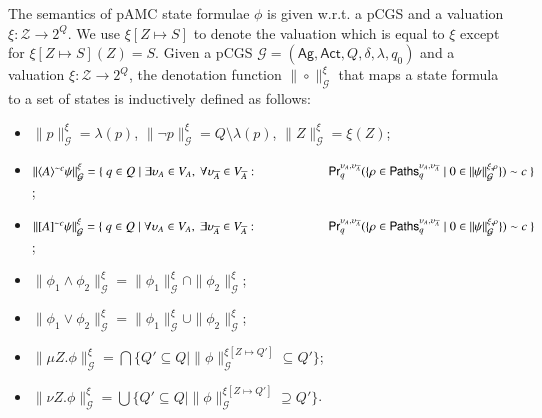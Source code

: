 \documentclass[letterpaper]{article}
\newcommand{\calZ}{\mathcal{Z}}
\newcommand{\calM}{\mathcal{G}}
\newcommand{\calP}{{\sf Paths}}
\newcommand{\Ag}{\textsf{Ag}}
\newcommand{\Act}{\textsf{Act}}
\newcommand{\Prb}{\textsf{Pr}}
\newcommand{\nA}{\overline{A}}
\newcommand{\pamc}{{pAMC}\xspace}
\newcommand{\opA}[1]{\langle{#1}\rangle}
\newcommand{\opUA}[1]{[{#1}]}
\newcommand {\semantics}[1]{\|{#1}\|}  %
\begin{document}
The semantics of \pamc state formulae $\phi$ is given w.r.t. a pCGS and a valuation $\xi:\calZ\rightarrow 2^Q$.
We use $\xi[Z\mapsto S]$ to denote the valuation which is equal to $\xi$ except for $\xi[Z\mapsto S](Z)=S$.
Given a pCGS $\calM=(\Ag,\Act, Q, \delta,\lambda,q_0)$ and a valuation $\xi:\calZ\rightarrow 2^Q$,
the denotation function $\semantics{\circ}_\calM^\xi$ that maps a state formula to a set of states is inductively defined as follows:

\begin{itemize}
  \item $\semantics{p}_\calM^\xi=\lambda(p)$, $\semantics{\neg p}_\calM^\xi=Q\setminus \lambda(p)$, $\semantics{Z}_\calM^\xi=\xi(Z)$;
  \item $\semantics{\opA{A}^{\sim c}\psi}_\calM^\xi= \{ \ q\in Q\mid \exists \upsilon_A\in V_A, \ \forall \upsilon_{\nA}\in V_{\nA}:\\ \hspace*{20mm}\Prb_q^{\upsilon_A,\upsilon_{\nA}}(\{\rho\in \calP_q^{\upsilon_A,\upsilon_{\nA}}\mid 0\in  \semantics{\psi}_\calM^{\xi,\rho}\})\sim c \ \}$;
  \item $\semantics{\opUA{A}^{\sim c}\psi}_\calM^\xi= \{ \ q\in Q\mid \forall \upsilon_A\in V_A, \ \exists \upsilon_{\nA}\in V_{\nA}: \\ \hspace*{20mm} \Prb_q^{\upsilon_A,\upsilon_{\nA}}(\{\rho\in \calP_q^{\upsilon_A,\upsilon_{\nA}}\mid 0\in  \semantics{\psi}_\calM^{\xi,\rho}\})\sim c \ \}$;
  \item $\semantics{\phi_1\wedge \phi_2}_\calM^\xi=\semantics{\phi_1}_\calM^\xi\cap\semantics{\phi_2}_\calM^\xi$;
  \item $\semantics{\phi_1\vee \phi_2}_\calM^\xi=\semantics{\phi_1}_\calM^\xi\cup\semantics{\phi_2}_\calM^\xi$;
  \item $\semantics{\mu Z. \phi}_\calM^\xi=\bigcap\{Q'\subseteq Q\mid \semantics{\phi}_\calM^{\xi[Z\mapsto Q']}\subseteq Q'\}$;
  \item	$\semantics{\nu Z. \phi}_\calM^\xi=\bigcup\{Q'\subseteq Q\mid \semantics{\phi}_\calM^{\xi[Z\mapsto Q']}\supseteq Q'\}$.
 \end{itemize}
\end{document}
